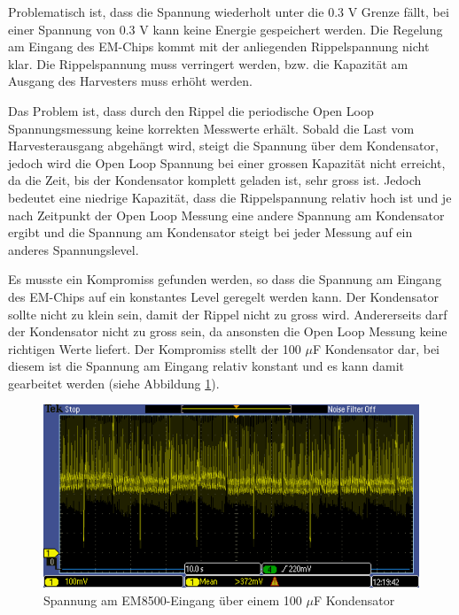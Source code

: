 Problematisch ist, dass die Spannung wiederholt unter die 0.3 V Grenze fällt, bei einer Spannung von 0.3 V kann keine Energie gespeichert werden. Die Regelung am Eingang des EM-Chips kommt mit der anliegenden Rippelspannung nicht klar. Die Rippelspannung muss verringert werden, bzw. die Kapazität am Ausgang des Harvesters muss erhöht werden. 

Das Problem ist, dass durch den Rippel die periodische Open Loop Spannungsmessung keine korrekten Messwerte erhält. Sobald die Last vom Harvesterausgang abgehängt wird, steigt die Spannung über dem Kondensator, jedoch wird die Open Loop Spannung bei einer grossen Kapazität nicht erreicht, da die Zeit, bis der Kondensator komplett geladen ist, sehr gross ist. Jedoch bedeutet eine niedrige Kapazität, dass die Rippelspannung relativ hoch ist und je nach Zeitpunkt der Open Loop Messung eine andere Spannung am Kondensator ergibt und die Spannung am Kondensator steigt bei jeder Messung auf ein anderes Spannungslevel.

Es musste ein Kompromiss gefunden werden, so dass die Spannung am Eingang des EM-Chips auf ein konstantes Level geregelt werden kann. Der Kondensator sollte nicht zu klein sein, damit der Rippel nicht zu gross wird. Andererseits darf der Kondensator nicht zu gross sein, da ansonsten die Open Loop Messung keine richtigen Werte liefert. Der Kompromiss stellt der 100 $\mu$F Kondensator dar, bei diesem ist die Spannung am Eingang relativ konstant und es kann damit gearbeitet werden (siehe Abbildung \ref{VCC_100uF_15kmh_Periode}).

\begin{figure}[ht]
    \includegraphics{3Vorgehen/imag/VCC_100uF_15kmh_Periode.PNG}
    \caption{Spannung am EM8500-Eingang über einem 100 $\mu$F Kondensator}
	\label{VCC_100uF_15kmh_Periode} 
\end{figure}

